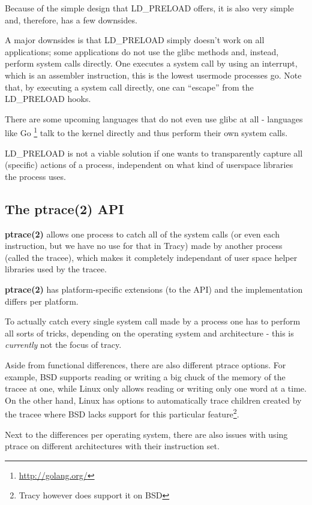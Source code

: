 \documentclass[a4paper, twoside, 10pt, twocolumn]{report}
\begin{document}
Because of the simple design that LD\_PRELOAD offers, it is also very simple
and, therefore, has a few downsides.

A major downsides is that LD\_PRELOAD simply doesn't work on all applications;
some applications do not use the glibc methods and, instead, perform system
calls directly. One executes a system call by using an interrupt, which is an
assembler instruction, this is the lowest usermode processes go. Note that, by
executing a system call directly, one can ``escape'' from the LD\_PRELOAD hooks.

There are some upcoming languages that do not even use glibc at all - languages
like Go \footnote{\url{http://golang.org/}} talk to the kernel directly and
thus perform their own system calls.

LD\_PRELOAD is not a viable solution if one wants to transparently capture all
(specific) actions of a process, independent on what kind of userspace libraries
the process uses.

\subsection{The ptrace(2) API}

\textbf{ptrace(2)} allows one process to catch all of the system calls (or even
each instruction, but we have no use for that in Tracy)
made by another process (called the tracee), which makes it completely
independant of user space helper libraries used by the tracee.

\textbf{ptrace(2)} has platform-specific extensions (to the API) and the
implementation differs per platform.

To actually catch every single system call made by a process one has to
perform all sorts of tricks\cite{}, depending on the operating system and
architecture - this is \textit{currently} not the focus of tracy.

Aside from functional differences, there are also different ptrace options.
For example, BSD supports reading or writing a big chuck of the memory
of the tracee at one, while Linux only allows reading or writing only one
word at a time. On the other hand, Linux has options to automatically trace
children created by the tracee where BSD lacks support for
this particular feature\footnote{Tracy however does support it on BSD}.

Next to the differences per operating system, there are also issues with using
ptrace on different architectures with their instruction set.
\end{document}
